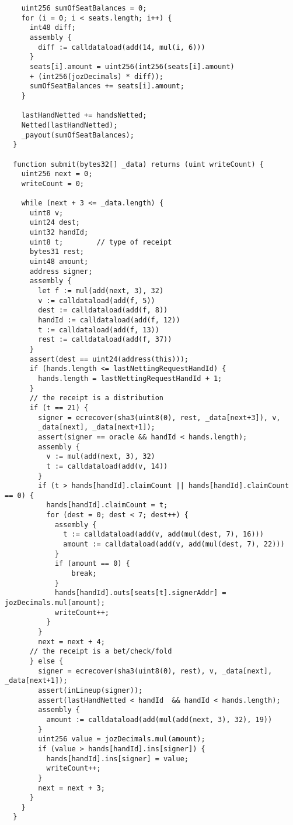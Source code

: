 \documentclass[conference]{IEEEtran}
\begin{document}
\begin{verbatim}
    uint256 sumOfSeatBalances = 0;
    for (i = 0; i < seats.length; i++) {
      int48 diff;
      assembly {
        diff := calldataload(add(14, mul(i, 6)))
      }
      seats[i].amount = uint256(int256(seats[i].amount) 
      + (int256(jozDecimals) * diff));
      sumOfSeatBalances += seats[i].amount;
    }

    lastHandNetted += handsNetted;
    Netted(lastHandNetted);
    _payout(sumOfSeatBalances);
  }

  function submit(bytes32[] _data) returns (uint writeCount) {
    uint256 next = 0;
    writeCount = 0;

    while (next + 3 <= _data.length) {
      uint8 v;
      uint24 dest;
      uint32 handId;
      uint8 t;        // type of receipt
      bytes31 rest;
      uint48 amount;
      address signer;
      assembly {
        let f := mul(add(next, 3), 32)
        v := calldataload(add(f, 5))
        dest := calldataload(add(f, 8))
        handId := calldataload(add(f, 12))
        t := calldataload(add(f, 13))
        rest := calldataload(add(f, 37))
      }
      assert(dest == uint24(address(this)));
      if (hands.length <= lastNettingRequestHandId) {
        hands.length = lastNettingRequestHandId + 1;
      }
      // the receipt is a distribution
      if (t == 21) {
        signer = ecrecover(sha3(uint8(0), rest, _data[next+3]), v, 
        _data[next], _data[next+1]);
        assert(signer == oracle && handId < hands.length);
        assembly {
          v := mul(add(next, 3), 32)
          t := calldataload(add(v, 14))
        }
        if (t > hands[handId].claimCount || hands[handId].claimCount == 0) {
          hands[handId].claimCount = t;
          for (dest = 0; dest < 7; dest++) {
            assembly {
              t := calldataload(add(v, add(mul(dest, 7), 16)))
              amount := calldataload(add(v, add(mul(dest, 7), 22)))
            }
            if (amount == 0) {
                break;
            }
            hands[handId].outs[seats[t].signerAddr] = jozDecimals.mul(amount);
            writeCount++;
          }
        }
        next = next + 4;
      // the receipt is a bet/check/fold
      } else {
        signer = ecrecover(sha3(uint8(0), rest), v, _data[next], _data[next+1]);
        assert(inLineup(signer));
        assert(lastHandNetted < handId  && handId < hands.length);
        assembly {
          amount := calldataload(add(mul(add(next, 3), 32), 19))
        }
        uint256 value = jozDecimals.mul(amount);
        if (value > hands[handId].ins[signer]) {
          hands[handId].ins[signer] = value;
          writeCount++;
        }
        next = next + 3;
      }
    }
  }



\end{verbatim}
\end{document}
